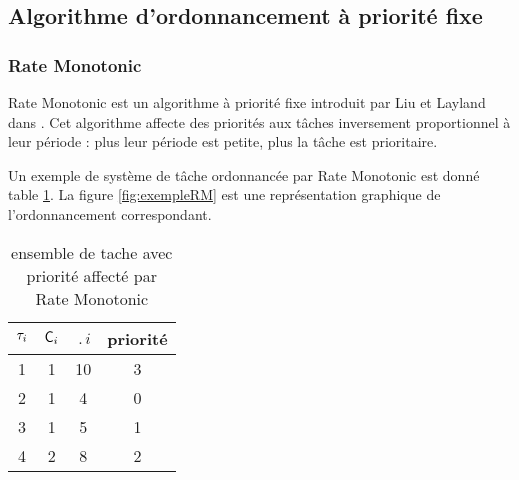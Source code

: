 \subsection{Algorithme d’ordonnancement à priorité fixe}
\subsubsection{Rate Monotonic \cite{LL73}}
Rate Monotonic est un algorithme à priorité fixe
introduit par Liu et Layland dans \cite{LL73}. Cet algorithme affecte
des priorités aux tâches inversement proportionnel à leur période :
plus leur période est petite, plus la tâche est prioritaire.

Un exemple de système de tâche ordonnancée par Rate
Monotonic est donné table \ref{tab:exempleRM}. La figure
\ref{fig:exempleRM} est une représentation graphique de
l'ordonnancement correspondant.

\begin{table}[h]
\begin{center}
\begin{tabular}{|c|c|c|c|}
 \hline $\tau_{i}$ & $\mathsf{C}_{i}$ & $\period{i}$ & priorité\\ 
 \hline 1 & 1 & 10 & 3\\ 
 \hline 2 & 1 & 4 & 0\\ 
 \hline 3 & 1 & 5 & 1\\ 
 \hline 4 & 2 & 8 & 2\\ 
 \hline
 \end{tabular}
\end{center}
\caption{ensemble de tache avec priorité affecté par Rate Monotonic} \label{tab:exempleRM}
\end{table}


